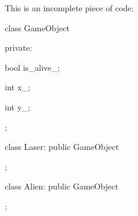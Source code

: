 This is an incomplete piece of code:

\begin{console}

class GameObject

{

private:

        bool is_alive_;

        int x_;

        int y_;

};



class Laser: public GameObject

{

};



class Alien: public GameObject

{

};

\end{console}

